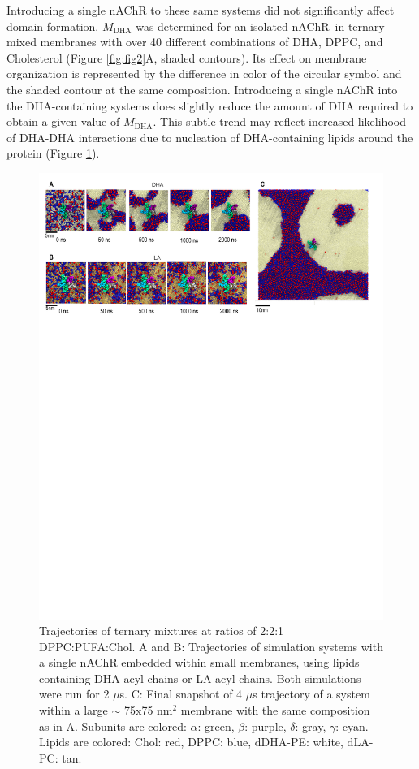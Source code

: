 \documentclass[final,3p,times,twocolumn]{elsarticle}
\newcommand{\mself}[1]{M_{\mathrm{#1}}}
\newcommand{\nachr}{nAChR}
\begin{document}
	Introducing a single nAChR to these same systems did not significantly affect domain formation. $\mself{DHA}$ was determined for an isolated \nachr~in ternary mixed membranes with over 40 different combinations of DHA, DPPC, and Cholesterol (Figure \ref{fig:fig2}A, shaded contours). Its effect on membrane organization is represented by the difference in color of the circular symbol and the shaded contour at the same composition.  Introducing a single nAChR into the DHA-containing systems does slightly reduce the amount of DHA required to obtain a given value of $\mself{DHA}$. 
	{ This subtle trend} may reflect increased likelihood of DHA-DHA interactions due to nucleation of DHA-containing lipids around the protein (Figure \ref{fig:fig1}). 
		\begin{figure}[t]
		\center
		\includegraphics[width=1\linewidth]{Fig1.pdf}
		\caption{ Trajectories of ternary mixtures at ratios of 2:2:1 DPPC:PUFA:Chol. A and B: Trajectories of simulation systems with a single nAChR embedded within small membranes, using lipids containing DHA acyl chains or LA acyl chains. Both simulations were run for 2 $\mu$s. C: Final snapshot of 4 $\mu$s trajectory of a system within a large $\sim$ 75x75 nm$^2$ membrane with the same composition as in A. Subunits are colored: $\alpha$: green, $\beta$: purple, $\delta$: gray, $\gamma$: cyan. Lipids are colored: Chol: red, DPPC: blue, dDHA-PE: white, dLA-PC: tan.} 
		\label{fig:fig1}
	\end{figure}
\end{document}
